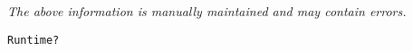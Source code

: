 \label{pkg:runtime}

{\tiny \it The above information is manually maintained and may contain errors.}
\begin{verbatim}
Runtime?
\end{verbatim}
